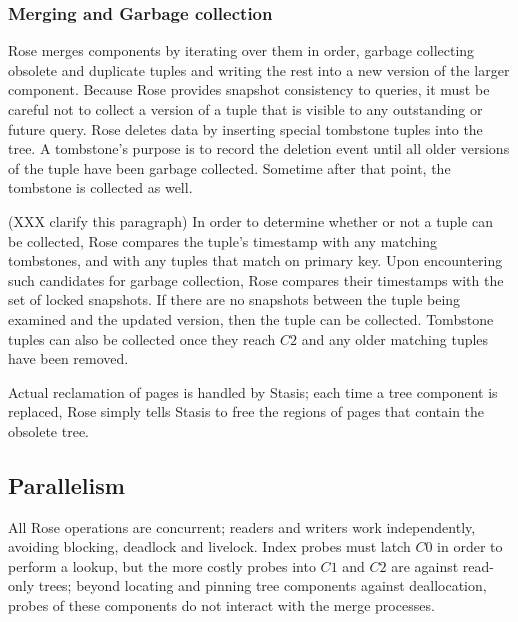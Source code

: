 \documentclass{vldb}
\newcommand{\rows}{Rose\xspace}
\begin{document}
\subsubsection{Merging and Garbage collection}

\rows merges components by iterating over them in order, garbage collecting
obsolete and duplicate tuples and writing the rest into a new version
of the larger component.  Because \rows provides snapshot consistency
to queries, it must be careful not to collect a version of a tuple that
is visible to any outstanding or future query.  \rows
deletes data by
inserting special tombstone tuples into the tree.  A tombstone's
purpose is to record the deletion event until all older versions of
the tuple have been garbage collected.  Sometime after that point, the tombstone
is collected as well.

(XXX clarify this paragraph) In order to determine whether or not a tuple can be collected, \rows
compares the tuple's timestamp with any matching tombstones, and with any tuples that
match on primary key.  Upon encountering such candidates for garbage collection,
\rows compares their timestamps with the set of locked snapshots.  If
there are no snapshots between the tuple being examined and the
updated version, then the tuple can be collected.  Tombstone tuples can
also be collected once they reach $C2$ and any older matching tuples
have been removed.

Actual reclamation of pages is handled by Stasis; each time a tree
component is replaced, \rows simply tells Stasis to free the regions of
pages that contain the obsolete tree.


\subsection{Parallelism}

All \rows operations are concurrent; readers and writers work
independently, avoiding blocking, deadlock and livelock.  Index probes
must latch $C0$ in order to perform a lookup, but the more costly
probes into $C1$ and $C2$ are against read-only trees; beyond locating
and pinning tree components against deallocation, probes of these
components do not interact with the merge processes.
\end{document}
